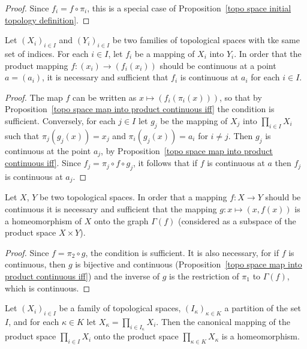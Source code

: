 \begin{proof}
Since $f_i=f\circ\pi_i$, this is a special case of Proposition~\ref{topo space initial topology definition}.
\end{proof}
\begin{corollary}\label{topological product map continuous iff}
Let $(X_i)_{i\in I}$ and $(Y_i)_{i\in I}$ be two families of topological spaces with tke same set of indices. For each $i\in I$, let $f_i$ be a mapping of $X_i$ into $Y_i$. In order that the product mapping $f:(x_i)\to(f_i(x_i))$ should be continuous at a point $a=(a_i)$, it is necessary and sufficient that $f_i$ is continuous at $a_i$ for each $i\in I$.
\end{corollary}
\begin{proof}
The map $f$ can be written as $x\mapsto(f_i(\pi_i(x)))$, so that by Proposition~\ref{topo space map into product continuous iff} the condition is sufficient. Conversely, for each $j\in I$ let $g_j$ be the mapping of $X_j$ into $\prod_{i\in I}X_i$ such that $\pi_j(g_j(x))=x_j$ and $\pi_i(g_j(x))=a_i$ for $i\neq j$. Then $g_j$ is continuous at the point $a_j$, by Proposition~\ref{topo space map into product continuous iff}. Since $f_j=\pi_j\circ f\circ g_j$, it follows that if $f$ is continuous at $a$ then $f_j$ is continuous at $a_j$.
\end{proof}
\begin{corollary}
Let $X$, $Y$ be two topological spaces. In order that a mapping $f:X\to Y$ should be continuous it is necessary and sufficient that the mapping $g:x\mapsto(x,f(x))$ is a homeomorphism of $X$ onto the graph $\Gamma(f)$ (considered as a subspace of the product space $X\times Y$).
\end{corollary}
\begin{proof}
Since $f=\pi_2\circ g$, the condition is sufficient. It is also necessary, for if $f$ is continuous, then $g$ is bijective and continuous (Proposition~\ref{topo space map into product continuous iff}) and the inverse of $g$ is the restriction of $\pi_1$ to $\Gamma(f)$, which is continuous.
\end{proof}
\begin{proposition}
Let $(X_i)_{i\in I}$ be a family of topological spaces, $(I_\kappa)_{\kappa\in K}$ a partition of the set $I$, and for each $\kappa\in K$ let $X_\kappa=\prod_{i\in I_\kappa}X_i$. Then the canonical mapping of the product space $\prod_{i\in I}X_i$ onto the product space $\prod_{\kappa\in K}X_\kappa$ is a homeomorphism.
\end{proposition}
